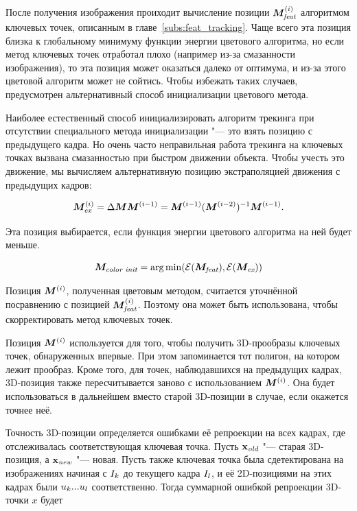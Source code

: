 После получения изображения проиходит вычисление позиции $\bm{M}^{\left( i \right)}_{\text {\it feat}}$
алгоритмом
ключевых точек, описанным в главе~\ref{subs:feat_tracking}.
Чаще всего эта позиция близка к глобальному минимуму функции энергии цветового
алгоритма, но если метод ключевых точек отработал плохо (например из-за
смазанности изображения), то эта позиция может оказаться далеко от оптимума, и
из-за этого цветовой алгоритм может не сойтись.
Чтобы избежать таких случаев, предусмотрен альтернативный способ инициализации
цветового метода.

Наиболее естественный способ инициализировать алгоритм трекинга при отсутствии
специального метода инициализации "--- это взять позицию с предыдущего кадра.
Но очень часто неправильная работа трекинга на ключевых точках вызвана
смазанностью при быстром движении объекта.
Чтобы учесть это движение, мы вычисляем альтернативную позицию экстраполяцией
движения с предыдущих кадров:

\begin{equation}
\label{eqn:extrapolation}
\bm{M}^{\left( i \right)}_{\text{\it ex}} = \Delta \bm{M} \bm{M}^{\left( i - 1 \right)} = \bm{M}^{\left( i -
1 \right)}(\bm{M}^{\left( i - 2 \right)})^{-1} \bm{M}^{\left( i - 1 \right)}
\text{.}
\end{equation}

Эта позиция выбирается, если функция энергии цветового алгоритма на ней будет
меньше.

\begin{equation}
\label{eqn:init_selection}
\bm{M}_{\text{\it color init}} = \operatorname*{arg\,min}(\mathcal{E}(\bm{M}_{\text {\it feat}}),
\mathcal{E}(\bm{M}_{\text{\it ex}}))
\end{equation}

Позиция $\bm{M}^{\left( i \right)}$, полученная цветовым методом, считается уточнённой
посравнению с позицией $\bm{M}^{\left( i \right)}_{\text {\it feat}}$.
Поэтому она может быть использована, чтобы скорректировать метод ключевых
точек.

Позиция $\bm{M}^{\left( i \right)}$ используется для того, чтобы получить 3D-прообразы
ключевых точек, обнаруженных впервые.
При этом запоминается тот полигон, на котором лежит прообраз.
Кроме того, для точек, наблюдавшихся на предыдущих кадрах, 3D-позиция также
пересчитывается заново с использованием $\bm{M}^{\left( i \right)}$.
Она будет использоваться в дальнейшем вместо старой 3D-позиции в случае, если
окажется точнее неё.

Точность 3D-позиции определяется ошибками её репроекции на всех кадрах, где
отслеживалась соответствующая ключевая точка.
Пусть $\mathbf{x_{\text {\it old}}}$ "--- старая 3D-позиция, а $\mathbf{x_{\text{\it new}}}$ "--- новая. 
Пусть также ключевая точка была сдетектирована на изображениях начиная с
$I_k$
до текущего кадра $I_l$, и её 2D-позициями на этих кадрах были $\mathnormal{u}_k ...
\mathnormal{u}_l$
соответственно.
Тогда суммарной ошибкой репроекции 3D-точки $x$ будет

